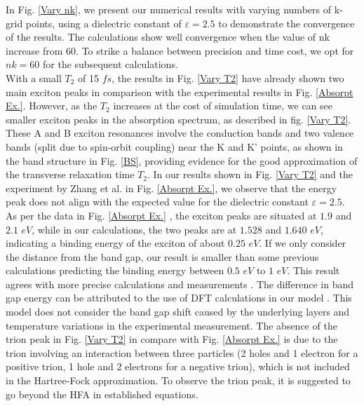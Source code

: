 \documentclass[12pt,english,a4paper]{article}
\begin{document}
\quad In Fig. \ref{Vary nk}, we present our numerical results with varying numbers of k-grid points, using a dielectric constant of $\varepsilon = 2.5$ to demonstrate the convergence of the results. The calculations show well convergence when the value of nk increase from 60. To strike a balance between precision and time cost, we opt for $nk = 60$ for the subsequent calculations.\\\null
\quad With a small $T_2$ of 15 \(fs\), the results in Fig. \ref{Vary T2} have already shown two main exciton peaks in comparison with the experimental results in Fig. \ref{Absorpt Ex.}. However, as the $T_2$ increases at the cost of simulation time, we can see smaller exciton peaks in the absorption spectrum, as described in fig. \ref{Vary T2}. These A and B exciton resonances involve the conduction bands and two valence bands (split due to spin-orbit coupling) near the K and $\mathrm{K}$' points, as shown in the band structure in Fig. \ref{BS}, providing evidence for the good approximation of the transverse relaxation time $T_2$. In our results shown in Fig. \ref{Vary T2} and the experiment by Zhang et al. \cite{zhang_absorption_2014} in Fig. \ref{Absorpt Ex.}, we observe that the energy peak does not align with the expected value for the dielectric constant $\varepsilon = 2.5$. As per the data in Fig. \ref{Absorpt Ex.} \cite{zhang_absorption_2014}, the exciton peaks are situated at $1.9$ and $2.1$ \(eV\), while in our calculations, the two peaks are at $1.528$ and $1.640$ \(eV\), indicating a binding energy of the exciton of about $0.25$ \(eV\). If we only consider the distance from the band gap, our result is smaller than some previous calculations predicting the binding energy between $0.5$ \(eV\) to $1 $ \(eV\)\cite{ramasubramaniam_large_2012,qiu_optical_2013,cheiwchanchamnangij_quasiparticle_2012, shi_quasiparticle_2013}. This result agrees with more precise calculations and measurements \cite{zhang_absorption_2014, kirichenko_influence_2021, zhang_direct_2014}. The difference in band gap energy can be attributed to the use of DFT calculations in our model \cite{liu_three-band_2013}. This model does not consider the band gap shift caused by the underlying layers and temperature variations in the experimental measurement. The absence of the trion peak in Fig. \ref{Vary T2} in compare with Fig. \ref{Absorpt Ex.} is due to the trion involving an interaction between three particles (2 holes and 1 electron for a positive trion, 1 hole and 2 electrons for a negative trion), which is not included in the Hartree-Fock approximation. To observe the trion peak, it is suggested to go beyond the HFA in established equations.\\
\end{document}
